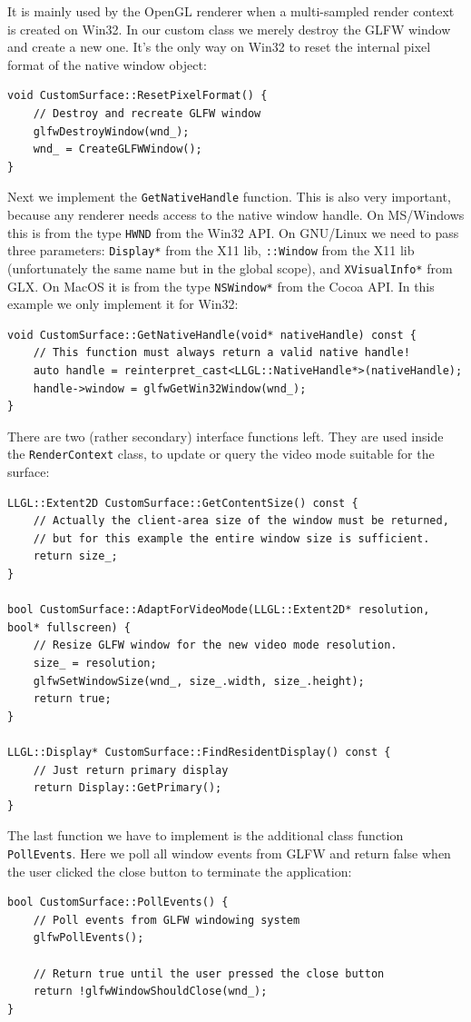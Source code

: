 \documentclass{article}
\begin{document}
It is mainly used by the OpenGL renderer when a multi-sampled render context is created on Win32.
In our custom class we merely destroy the GLFW window and create a new one.
It's the only way on Win32 to reset the internal pixel format of the native window object:
\begin{lstlisting}
void CustomSurface::ResetPixelFormat() {
	// Destroy and recreate GLFW window
	glfwDestroyWindow(wnd_);
	wnd_ = CreateGLFWWindow();
}
\end{lstlisting}
Next we implement the \texttt{GetNativeHandle} function. This is also very important,
because any renderer needs access to the native window handle.
On MS/Windows this is from the type \texttt{HWND} from the Win32 API.
On GNU/Linux we need to pass three parameters: \texttt{Display*} from the X11 lib,
\texttt{::Window} from the X11 lib (unfortunately the same name but in the global scope),
and \texttt{XVisualInfo*} from GLX.
On MacOS it is from the type \texttt{NSWindow*} from the Cocoa API.
In this example we only implement it for Win32:
\begin{lstlisting}
void CustomSurface::GetNativeHandle(void* nativeHandle) const {
	// This function must always return a valid native handle!
	auto handle = reinterpret_cast<LLGL::NativeHandle*>(nativeHandle);
	handle->window = glfwGetWin32Window(wnd_);
}
\end{lstlisting}
There are two (rather secondary) interface functions left.
They are used inside the \texttt{RenderContext} class, to update or query the video mode suitable for the surface:
\begin{lstlisting}
LLGL::Extent2D CustomSurface::GetContentSize() const {
	// Actually the client-area size of the window must be returned,
	// but for this example the entire window size is sufficient.
	return size_;
}

bool CustomSurface::AdaptForVideoMode(LLGL::Extent2D* resolution, bool* fullscreen) {
	// Resize GLFW window for the new video mode resolution.
	size_ = resolution;
	glfwSetWindowSize(wnd_, size_.width, size_.height);
	return true;
}

LLGL::Display* CustomSurface::FindResidentDisplay() const {
	// Just return primary display
	return Display::GetPrimary();
}
\end{lstlisting}
The last function we have to implement is the additional class function \texttt{PollEvents}.
Here we poll all window events from GLFW and return false when the user
clicked the close button to terminate the application:
\begin{lstlisting}
bool CustomSurface::PollEvents() {
	// Poll events from GLFW windowing system
	glfwPollEvents();
	
	// Return true until the user pressed the close button
	return !glfwWindowShouldClose(wnd_);
}
\end{lstlisting}
\end{document}
